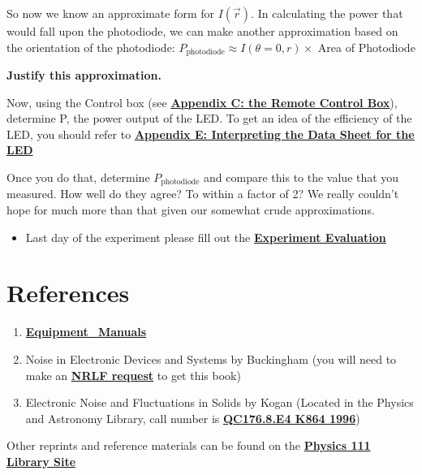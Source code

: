 \documentclass{../lab}
\begin{document}
So now we know an approximate form for $I(\vec{r})$. In calculating the power that would fall upon the photodiode, we can make another approximation based on the orientation of the photodiode: $P_\text{photodiode} \approx I(\theta = 0, r) \times$ Area of Photodiode

\textbf{Justify this approximation.}

Now, using the Control box (see \href{http://experimentationlab.berkeley.edu/node/98}{\textbf{Appendix C: the Remote Control Box}}), determine P, the power output of the LED. To get an idea of the efficiency of the LED, you should refer to \href{http://experimentationlab.berkeley.edu/node/100}{\textbf{Appendix E: Interpreting the Data Sheet for the LED}}

Once you do that, determine $P_\text{photodiode}$ and compare this to the value that you measured. How well do they agree? To within a factor of 2? We really couldn't hope for much more than that given our somewhat crude approximations.

\begin{itemize}
    \item Last day of the experiment please fill out the \href{\ExperimentEvaluation}{\textbf{Experiment Evaluation}}

\end{itemize}

\section{References}
\label{sec:References}

\begin{enumerate}
    \item \href{http://physics111.lib.berkeley.edu/Physics111/Equipment\_Manuals/LLS/indexequipLLS.html}{\textbf{Equipment\_Manuals}}

    \item Noise in Electronic Devices and Systems by Buckingham (you will need to make an \href{http://oskicat.berkeley.edu/screens/help\_borrowing.html#nrlfrequest}{\textbf{NRLF request}} to get this book)

    \item Electronic Noise and Fluctuations in Solids by Kogan (Located in the Physics and Astronomy Library, call number is \href{http://oskicat.berkeley.edu/search\~S1?/cQC176.8.E4+K864+1996/cqc++176.8+e4+k864+1996/-3,-1,,B/browse}{\textbf{QC176.8.E4 K864 1996}})

\end{enumerate}

\noindent Other reprints and reference materials can be found on the \href{http://physics111.lib.berkeley.edu/Physics111/Reprints/LLS/LLS\_index.html}{\textbf{Physics 111 Library Site}}
\end{document}
